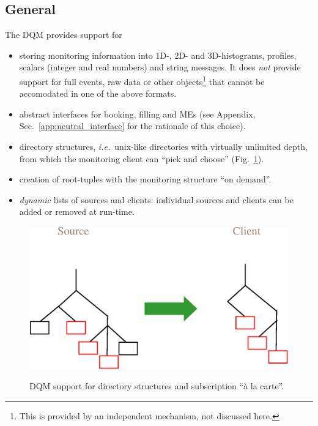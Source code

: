 \documentclass{cmspaper}
\newcommand {\ie}{\mbox{\sl i.e. }}     %
\begin{document}
\subsection{General}
\label{sec:req_general}
The DQM provides support for 
\begin{itemize}
\item{storing monitoring information into 1D-, 2D- and 3D-histograms,
profiles, scalars (integer and real numbers) and string messages. It
does \emph{not} provide support for full events, raw data or other
objects\footnote{This is provided by an independent mechanism, not
discussed here.} that cannot be accomodated in one of the above formats.} 
\item{abstract interfaces for booking, filling and MEs (see Appendix,
Sec.~\ref{app:neutral_interface} for the rationale of this choice).}
\item{directory structures, \ie unix-like directories with
virtually unlimited depth, from which the monitoring client can ``pick
and choose'' (Fig.~\ref{fig:dir_structure_support}). }
\item{creation of root-tuples with the monitoring structure ``on demand''.}
\item{\emph{dynamic} lists of sources and clients: individual sources and
clients can be added or removed at run-time.} 
\end{itemize}
%
\begin{figure}[hbtp]
  \begin{center}
    \resizebox{10cm}{!}
	{\includegraphics{figures/dir_structure_support.eps}} 
\caption{DQM support for directory structures and subscription ``\`a
la carte''.}
\label{fig:dir_structure_support}
  \end{center}
\end{figure}
%
%
\end{document}
